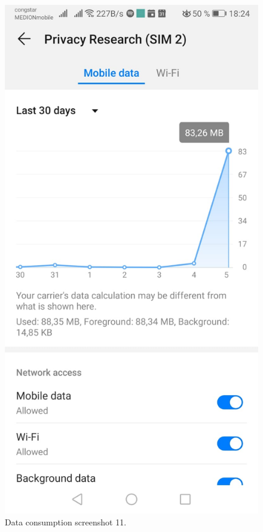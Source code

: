 \begin{figure}
	\centering
	\begin{minipage}{.45\textwidth}
		\begin{center}
		\includegraphics[width=\textwidth]{data/data-usage/data-usage9-2.jpeg}
		\caption{Data consumption screenshot 11.}
		\end{center}
	\end{minipage}
	\hfill
\end{figure}